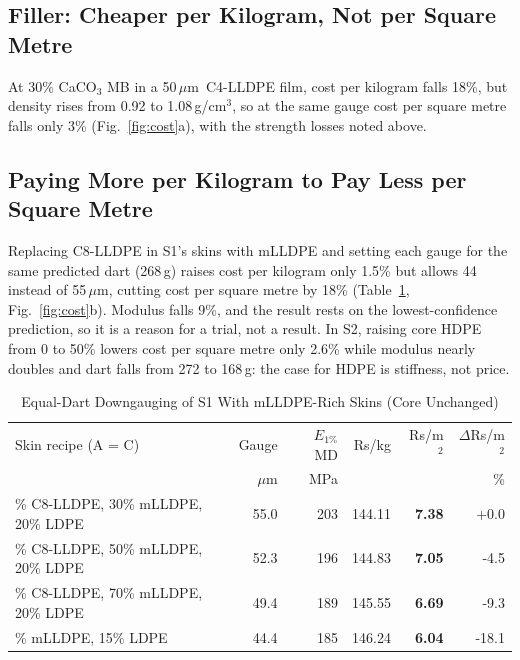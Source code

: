 \documentclass[conference,a4paper]{IEEEtran}
\newcommand{\um}{\,$\mu$m}
\begin{document}
\subsection{Filler: Cheaper per Kilogram, Not per Square Metre}
At 30\% CaCO$_3$ MB in a 50\um\ C4-LLDPE film, cost per kilogram falls 18\%, but density rises from 0.92 to 1.08\,g/cm$^3$, so at the same gauge cost per square metre falls only 3\% (Fig.~\ref{fig:cost}a), with the strength losses noted above.

\subsection{Paying More per Kilogram to Pay Less per Square Metre}
Replacing C8-LLDPE in S1's skins with mLLDPE and setting each gauge for the same predicted dart (268\,g) raises cost per kilogram only 1.5\% but allows 44 instead of 55\um, cutting cost per square metre by 18\% (Table~\ref{tab:down}, Fig.~\ref{fig:cost}b). Modulus falls 9\%, and the result rests on the lowest-confidence prediction, so it is a reason for a trial, not a result. In S2, raising core HDPE from 0 to 50\% lowers cost per square metre only 2.6\% while modulus nearly doubles and dart falls from 272 to 168\,g: the case for HDPE is stiffness, not price.



\begin{table}[!t]
\caption{Equal-Dart Downgauging of S1 With mLLDPE-Rich Skins (Core Unchanged)}
\label{tab:down}\centering\footnotesize\setlength{\tabcolsep}{3pt}
\begin{tabular}{>{\raggedright\arraybackslash}p{2.3cm}rrrrr}
\toprule
Skin recipe (A = C) & Gauge & $E_{1\%}$ MD & Rs/kg & Rs/m$^2$ & $\Delta$Rs/m$^2$ \\
 & $\mu$m & MPa & & & \% \\
\midrule
50\% C8-LLDPE, 30\% mLLDPE, 20\% LDPE & 55.0 & 203 & 144.11 & \textbf{7.38} & +0.0 \\
30\% C8-LLDPE, 50\% mLLDPE, 20\% LDPE & 52.3 & 196 & 144.83 & \textbf{7.05} & -4.5 \\
10\% C8-LLDPE, 70\% mLLDPE, 20\% LDPE & 49.4 & 189 & 145.55 & \textbf{6.69} & -9.3 \\
85\% mLLDPE, 15\% LDPE & 44.4 & 185 & 146.24 & \textbf{6.04} & -18.1 \\
\bottomrule
\end{tabular}
\end{table}
\end{document}
